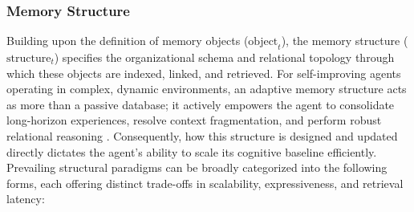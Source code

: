 \documentclass{article}
\begin{document}
\subsubsection{Memory Structure}
\label{sec:Memory_Structure}

Building upon the definition of memory objects ($\text{object}_t$), the memory structure ($\text{structure}_t$) specifies the organizational schema and relational topology through which these objects are indexed, linked, and retrieved. For self-improving agents operating in complex, dynamic environments, an adaptive memory structure acts as more than a passive database; it actively empowers the agent to consolidate long-horizon experiences, resolve context fragmentation, and perform robust relational reasoning \citep{zeng2024structuralmemoryllmagents}. Consequently, how this structure is designed and updated directly dictates the agent's ability to scale its cognitive baseline efficiently. Prevailing structural paradigms can be broadly categorized into the following  forms, each offering distinct trade-offs in scalability, expressiveness, and retrieval latency:
\end{document}
